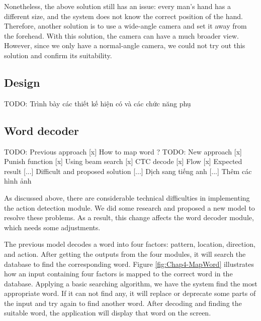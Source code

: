 Nonetheless, the above solution still has an issue: every man's hand has a different size, and the system does not know the correct position of the hand. Therefore, another solution is to use a wide-angle camera and set it away from the forehead. With this solution, the camera can have a much broader view. However, since we only have a normal-angle camera, we could not try out this solution and confirm its suitability.

\subsection{Design}
TODO: Trình bày các thiết kế hiện có và các chức năng phụ

\subsection{Word decoder}
TODO:   Previous approach 
[x] How to map word ?
TODO:   New approach
[x] Punish function
[x] Using beam search
[x] CTC decode
[x] Flow
[x] Expected result
[...] Difficult and proposed solution
[...] Dịch sang tiếng anh
[...] Thêm các hình ảnh



As discussed above, there are considerable technical difficulties in implementing the action detection module. We did some research and proposed a new model to resolve these problems. As a result, this change affects the word decoder module, which needs some adjustments.

The previous model decodes a word into four factors: pattern, location, direction, and action. After getting the outputs from the four modules, it will search the database to find the corresponding word. Figure \ref{fig:Chap4-MapWord} illustrates how an input containing four factors is mapped to the correct word in the database. Applying a basic searching algorithm, we have the system find the most appropriate word. If it can not find any, it will replace or deprecate some parts of the input and try again to find another word. After decoding and finding the suitable word, the application will display that word on the screen.

